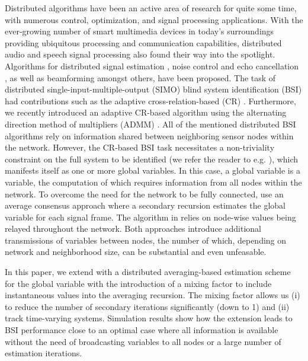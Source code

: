 \documentclass{article}
\begin{document}
Distributed algorithms have been an active area of research for quite some time, with numerous control, optimization, and signal processing applications.
With the ever-growing number of smart multimedia devices in today's surroundings providing ubiquitous processing and communication capabilities, distributed audio and speech signal processing also found their way into the spotlight.
Algorithms for distributed signal estimation \cite{5483092}, noise control and echo cancellation \cite{9670697}, as well as beamforming \cite{6663655,6329934,MARKOVICHGOLAN20154} amongst others, have been proposed.
The task of distributed single-input-multiple-output (SIMO) blind system identification (BSI) had contributions such as the adaptive cross-relation-based (CR) \cite{yuDistributedBlindSystem2014, liuDistributedBlindIdentification2016}.
Furthermore, we recently introduced an adaptive CR-based algorithm \cite{blochbergerDBSI} using the alternating direction method of multipliers (ADMM) \cite{boydDistributedOptimizationStatistical2011}.
All of the mentioned distributed BSI algorithms rely on information shared between neighboring sensor nodes within the network.
However, the CR-based BSI task necessitates a non-triviality constraint on the full system to be identified (we refer the reader to e.g. \cite{huangAdaptiveMultichannelLeast2002,huangClassFrequencydomainAdaptive2003}), which manifests itself as one or more global variables.
In this case, a global variable is a variable, the computation of which requires information from all nodes within the network.
To overcome the need for the network to be fully connected, \cite{yuDistributedBlindSystem2014, liuDistributedBlindIdentification2016} use an average consensus \cite{xiaoFastLinearIterations2004} approach where a secondary recursion estimates the global variable for each signal frame.
The algorithm in \cite{blochbergerDBSI} relies on node-wise values being relayed throughout the network.
Both approaches introduce additional transmissions of variables between nodes, the number of which, depending on network and neighborhood size, can be substantial and even unfeasable.

In this paper, we extend \cite{blochbergerDBSI} with a distributed averaging-based \cite{xiaoFastLinearIterations2004} estimation scheme for the global variable with the introduction of a mixing factor to include instantaneous values into the averaging recursion.
The mixing factor allows us (i) to reduce the number of secondary iterations significantly (down to 1) and (ii) track time-varying systems.
Simulation results show how the extension leads to BSI performance close to an optimal case where all information is available without the need of broadcasting variables to all nodes or a large number of estimation iterations.
\end{document}
